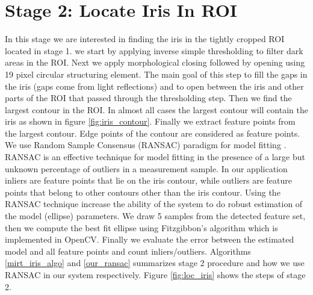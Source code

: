 \documentclass[12pt,fleqn]{book} %
\begin{document}
\section{Stage 2: Locate Iris In ROI} 
In this stage we are interested in finding the iris in the tightly cropped ROI located in stage 1. we start by applying inverse simple thresholding to filter dark areas in the ROI. Next we apply morphological closing followed by opening using 19 pixel circular structuring element. The main goal of this step to fill the gaps in the iris (gaps come from light reflections) and to open between the iris and other parts of the ROI that passed through the thresholding step. Then we find the largest contour in the ROI. In almost all cases the largest contour will contain the iris as shown in figure \ref{fig:iris_contour}. Finally we extract feature points from the largest contour. Edge points of the contour are considered as feature points. We use Random Sample Consensus (RANSAC) paradigm for model fitting \cite{ransac}. RANSAC is an effective technique for model fitting in the presence of a large but unknown percentage of outliers in a measurement sample. In our application inliers are feature points that lie on the iris contour, while outliers are feature points that belong to other contours other than the iris contour. Using the RANSAC technique increase the ability of the system to do robust estimation of the model (ellipse) parameters. We draw 5 samples from the detected feature set, then we compute the best fit ellipse using Fitzgibbon’s algorithm \cite{fitzgibbon96} which is implemented in OpenCV. Finally we evaluate the error between the estimated model and all feature points and count inliers/outliers. Algorithms \ref{mirt_iris_algo} and \ref{our_ransac} summarizes stage 2 procedure and how we use RANSAC in our system respectively. Figure \ref{fig:loc_iris} shows the steps of stage 2. 
\end{document}

